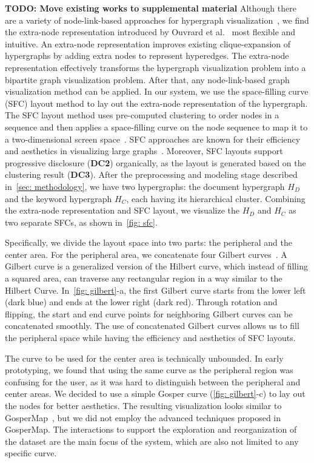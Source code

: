 \textbf{TODO: Move existing works to supplemental material}
Although there are a variety of node-link-based approaches for hypergraph visualization~\cite{fischer2021hypergraphsurvey}, we find the extra-node representation introduced by Ouvrard et al.~\cite{ouvrard2017hypergraph} most flexible and intuitive.
An extra-node representation improves existing clique-expansion of hypergraphs by adding extra nodes to represent hyperedges. 
The extra-node representation effectively transforms the hypergraph visualization problem into a bipartite graph visualization problem.
After that, any node-link-based graph visualization method can be applied.
In our system, we use the space-filling curve (SFC) layout method to lay out the extra-node representation of the hypergraph.
The SFC layout method uses pre-computed clustering to order nodes in a sequence and then applies a space-filling curve on the node sequence to map it to a two-dimensional screen space~\cite{muelder2008sfc}.
SFC approaches are known for their efficiency and aesthetics in visualizing large graphs~\cite{ma2013largegraph}.
Moreover, SFC layouts support progressive disclosure (\textbf{DC2}) organically, as the layout is generated based on the clustering result (\textbf{DC3}).
After the preprocessing and modeling stage described in~\autoref{sec: methodology}, we have two hypergraphs: the document hypergraph $H_D$ and the keyword hypergraph $H_C$, each having its hierarchical cluster.
Combining the extra-node representation and SFC layout, we visualize the $H_D$ and  $H_C$ as two separate SFCs, as shown in~\autoref{fig: sfc}.

Specifically, we divide the layout space into two parts: the peripheral and the center area.
For the peripheral area, we concatenate four Gilbert curves~\cite{gilbert}.
A Gilbert curve is a generalized version of the Hilbert curve,
which instead of filling a squared area, can traverse any rectangular region in a way similar to the Hilbert Curve.
In~\autoref{fig: gilbert}-a, the first Gilbert curve starts from the lower left (dark blue) and ends at the lower right (dark red).
Through rotation and flipping, the start and end curve points for neighboring Gilbert curves can be concatenated smoothly.
The use of concatenated Gilbert curves allows us to fill the peripheral space while having the efficiency and aesthetics of SFC layouts.

The curve to be used for the center area is technically unbounded. 
In early prototyping, we found that using the same curve as the peripheral region was confusing for the user, as it was hard to distinguish between the peripheral and center areas.
We decided to use a simple Gosper curve (\autoref{fig: gilbert}-c) to lay out the nodes for better aesthetics.
The resulting visualization looks similar to GosperMap~\cite{auber2013gospermap}, but we did not employ the advanced techniques proposed in GosperMap.
The interactions to support the exploration and reorganization of the dataset are the main focus of the system, which are also not limited to any specific curve.

